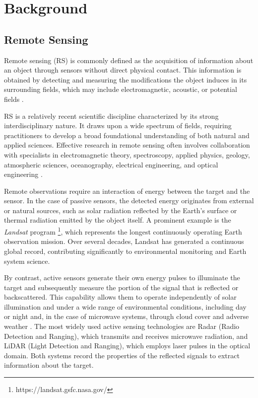 \chapter{Background}

\section{Remote Sensing}
Remote sensing (RS) is commonly defined as the acquisition of information about an object through sensors without direct physical contact. This information is obtained by detecting and measuring the modifications the object induces in its surrounding fields, which may include electromagnetic, acoustic, or potential fields \cite{book_Physics_Techniques_RS}.

RS is a relatively recent scientific discipline characterized by its strong interdisciplinary nature. It draws upon a wide spectrum of fields, requiring practitioners to develop a broad foundational understanding of both natural and applied sciences. Effective research in remote sensing often involves collaboration with specialists in electromagnetic theory, spectroscopy, applied physics, geology, atmospheric sciences, oceanography, electrical engineering, and optical engineering \cite{book_Physics_Techniques_RS}.

Remote observations require an interaction of energy between the target and the sensor. In the case of passive sensors, the detected energy originates from external or natural sources, such as solar radiation reflected by the Earth's surface or thermal radiation emitted by the object itself. A prominent example is the \textit{Landsat} program \footnote{https://landsat.gsfc.nasa.gov/}, which represents the longest continuously operating Earth observation mission. Over several decades, Landsat has generated a continuous global record, contributing significantly to environmental monitoring and Earth system science.

By contrast, active sensors generate their own energy pulses to illuminate the target and subsequently measure the portion of the signal that is reflected or backscattered. This capability allows them to operate independently of solar illumination and under a wide range of environmental conditions, including day or night and, in the case of microwave systems, through cloud cover and adverse weather \cite{RS_platforms_survey}. The most widely used active sensing technologies are Radar (Radio Detection and Ranging), which transmits and receives microwave radiation, and LiDAR (Light Detection and Ranging), which employs laser pulses in the optical domain. Both systems record the properties of the reflected signals to extract information about the target.

